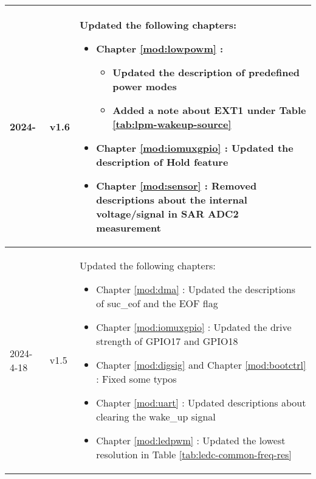 \begin{longtable}[l]{ | m{2cm} | m{1.5cm} | m{12cm} | }
    2024- & v1.6 &
    Updated the following chapters:
        \begin{itemize}
            \item Chapter \ref{mod:lowpowm} \textit{\nameref{mod:lowpowm}}:
                \begin{itemize}
                    \item Updated the description of predefined power modes %
                    \item Added a note about EXT1 under Table \ref{tab:lpm-wakeup-source} %
                \end{itemize}
            \item Chapter \ref{mod:iomuxgpio} \textit{\nameref{mod:iomuxgpio}}: Updated the description of Hold feature %
            \item Chapter \ref{mod:sensor} \textit{\nameref{mod:sensor}}: Removed descriptions about the internal voltage/signal in SAR ADC2 measurement %
        \end{itemize}
    \\\hline
    2024-4-18 & v1.5 &
    Updated the following chapters:
        \begin{itemize}
            \item Chapter \ref{mod:dma} \textit{\nameref{mod:dma}}: Updated the descriptions of suc\_eof and the EOF flag %
            \item Chapter \ref{mod:iomuxgpio} \textit{\nameref{mod:iomuxgpio}}: Updated the drive strength of GPIO17 and GPIO18 %
            \item Chapter \ref{mod:digsig} \textit{\nameref{mod:digsig}} and Chapter \ref{mod:bootctrl} \textit{\nameref{mod:bootctrl}}: Fixed some typos %
            \item Chapter \ref{mod:uart} \textit{\nameref{mod:uart}}: Updated descriptions about clearing the wake\_up signal %
            \item Chapter \ref{mod:ledpwm} \textit{\nameref{mod:ledpwm}}: Updated the lowest resolution in Table \ref{tab:ledc-common-freq-res}  %

\end{itemize}
\end{longtable}
